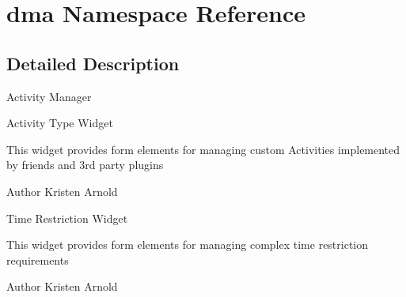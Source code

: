 \hypertarget{namespacedma}{\section{dma Namespace Reference}
\label{namespacedma}
}


\subsection{Detailed Description}
Activity Manager

Activity Type Widget

This widget provides form elements for managing custom Activities implemented by friends and 3rd party plugins

\begin{DoxyAuthor}{Author}
Kristen Arnold
\end{DoxyAuthor}
Time Restriction Widget

This widget provides form elements for managing complex time restriction requirements

\begin{DoxyAuthor}{Author}
Kristen Arnold 
\end{DoxyAuthor}
